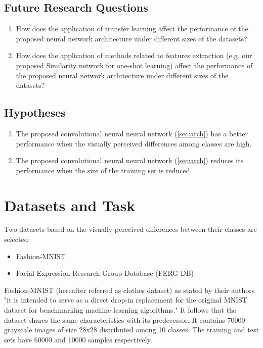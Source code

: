 \documentclass{article}
\begin{document}
\subsection{Future Research Questions}
\label{sec:frquestions}

\begin{enumerate}
  \item How does the application of transfer learning affect the performance of the proposed neural network architecture under different sizes of the datasets?
  \item How does the application of methods related to features extraction (e.g. our proposed Similarity network for one-shot learning) affect the performance of the proposed neural network architecture under different sizes of the datasets?
\end{enumerate}

\subsection{Hypotheses}
\label{sec:hypotheses}
\begin{enumerate}[label=\textbf{H.\arabic*}]
  \item \label{h:1} The proposed convolutional neural neural network (\ref{sec:arch}) has a better performance when the visually perceived differences among classes are high.
  \item \label{h:2} The proposed convolutional neural neural network (\ref{sec:arch}) reduces its performance when the size of the training set is reduced. 
 \end{enumerate}

\section{Datasets and Task}
\label{sec:data}

Two datasets based on the visually perceived differences between their classes are selected: 
\begin{itemize}
  \item Fashion-MNIST \citep{DBLP:journals/corr/abs-1708-07747}
  \item Facial Expression Research Group Database (FERG-DB)\citep{aneja2016modeling}
\end{itemize}

Fashion-MNIST (hereafter referred as clothes dataset) as stated by their authors "it is intended to serve as a direct drop-in replacement for the original MNIST dataset for benchmarking machine learning algorithms." It follows that the dataset shares the same characteristics with its predecessor. It contains 70000 grayscale images of size 28x28 distributed among 10 classes. The training and test sets have 60000 and 10000 samples respectively.
\end{document}
